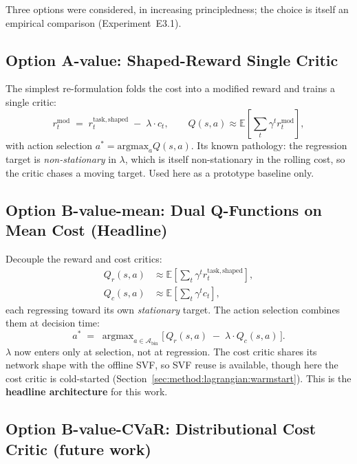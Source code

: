 \documentclass[11pt,a4paper]{report}
\begin{document}
Three options were considered, in increasing principledness; the
choice is itself an empirical comparison
(Experiment~E3.1).

\subsection{Option A-value: Shaped-Reward Single Critic}
\label{sec:method:lagrangian:A}

The simplest re-formulation folds the cost into a modified reward
and trains a single critic:
\begin{equation}
  r^{\mathrm{mod}}_t \;=\; r^{\mathrm{task,shaped}}_t \;-\; \lambda \cdot c_t,
  \qquad
  Q(s,a) \approx \mathbb{E}\!\left[\sum_t \gamma^t r^{\mathrm{mod}}_t\right],
  \label{eq:option-A}
\end{equation}
with action selection $a^* = \mathrm{argmax}_a Q(s,a)$. Its known
pathology: the regression target is \emph{non-stationary} in
$\lambda$, which is itself non-stationary in the rolling cost, so
the critic chases a moving target. Used here as a prototype baseline
only.

\subsection{Option B-value-mean: Dual Q-Functions on Mean Cost (Headline)}
\label{sec:method:lagrangian:Bmean}

Decouple the reward and cost critics:
\begin{align}
  Q_r(s,a) &\approx \mathbb{E}\!\left[\sum_t \gamma^t r^{\mathrm{task,shaped}}_t\right], \\
  Q_c(s,a) &\approx \mathbb{E}\!\left[\sum_t \gamma^t c_t\right],
\end{align}
each regressing toward its own \emph{stationary} target. The action
selection combines them at decision time:
\begin{equation}
  a^* \;=\; \mathop{\mathrm{argmax}}_{a \in \mathcal{A}_{\mathrm{bin}}}
  \Big[\,Q_r(s,a) \;-\; \lambda \cdot Q_c(s,a)\,\Big].
  \label{eq:Bmean-select}
\end{equation}
$\lambda$ now enters only at selection, not at regression. The
cost critic shares its network shape with the offline SVF, so SVF
reuse is available, though here the cost critic is cold-started
(Section~\ref{sec:method:lagrangian:warmstart}). This is the
\textbf{headline architecture} for this work.


\subsection{Option B-value-CVaR: Distributional Cost Critic (future work)}
\label{sec:method:lagrangian:Bcvar}
\end{document}
